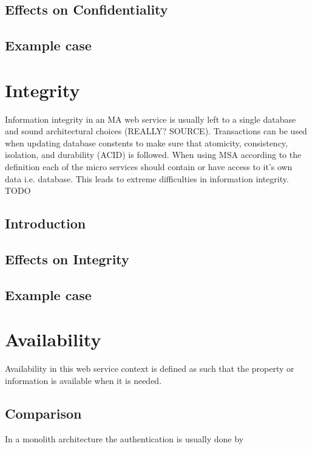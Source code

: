 \subsection{Effects on Confidentiality}
\subsection{Example case}

\section{Integrity}
\begin{sloppypar}
    Information integrity in an MA web service is usually left to a single database 
    and sound architectural choices (REALLY? SOURCE).
    Transactions can be used when updating database constents to make sure that
    atomicity, consistency, isolation, and durability (ACID) \citep{acid} is followed.
    When using MSA according to the definition each of the micro services should contain 
    or have access to it's own data i.e. database. This leads to extreme difficulties in information integrity.
    TODO
\end{sloppypar}


\subsection{Introduction}
\subsection{Effects on Integrity}
\subsection{Example case}



\section{Availability}
\begin{sloppypar}
    Availability in this web service context is defined as such that the property or information 
    is available when it is needed.

    
    
\end{sloppypar}

\subsection{Comparison}
\begin{sloppypar}
    In a monolith architecture the authentication is usually done by 
\end{sloppypar}


